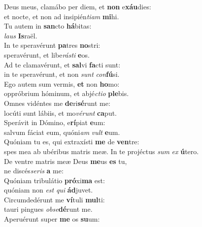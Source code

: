 \evenverse Deus meus, clamábo per diem, et \textbf{non} e\textbf{xáu}dies:~\*\\
\evenverse et nocte, et non ad insipién\textit{ti}\textit{am} \textbf{mi}hi.\\
\oddverse Tu autem in \textbf{san}cto \textbf{há}bitas:~\*\\
\oddverse \textit{laus} \textbf{Is}raël.\\
\evenverse In te speravérunt \textbf{pa}tres \textbf{no}stri:~\*\\
\evenverse speravérunt, et libe\textit{rá}\textit{sti} \textbf{e}os.\\
\oddverse Ad te clamavérunt, et \textbf{sal}vi \textbf{fa}cti sunt:~\*\\
\oddverse in te speravérunt, et non \textit{sunt} \textit{con}\textbf{fú}si.\\
\evenverse Ego autem sum vermis, \textbf{et} non \textbf{ho}mo:~\*\\
\evenverse oppróbrium hóminum, et abjé\textit{cti}\textit{o} \textbf{ple}bis.\\
\oddverse Omnes vidéntes me \textbf{de}ri\textbf{sé}runt me:~\*\\
\oddverse locúti sunt lábiis, et mo\textit{vé}\textit{runt} \textbf{ca}put.\\
\evenverse Sperávit in Dómino, e\textbf{rí}piat \textbf{e}um:~\*\\
\evenverse salvum fáciat eum, quóni\textit{am} \textit{vult} \textbf{e}um.\\
\oddverse Quóniam tu es, qui extraxísti \textbf{me} de \textbf{ven}tre:~\*\\
\oddverse spes mea ab ubéribus matris meæ. In te projéctus \textit{sum} \textit{ex} \textbf{ú}tero.\\
\evenverse De ventre matris meæ Deus \textbf{me}us \textbf{es} tu,~\*\\
\evenverse ne discés\textit{se}\textit{ris} \textbf{a} me:\\
\oddverse Quóniam tribulátio \textbf{pró}xi\textbf{ma} est:~\*\\
\oddverse quóniam non \textit{est} \textit{qui} \textbf{ád}juvet.\\
\evenverse Circumdedérunt me \textbf{ví}tuli \textbf{mul}ti:~\*\\
\evenverse tauri pingues \textit{ob}\textit{se}\textbf{dé}runt me.\\
\oddverse Aperuérunt super \textbf{me} os \textbf{su}um:~\*\\
